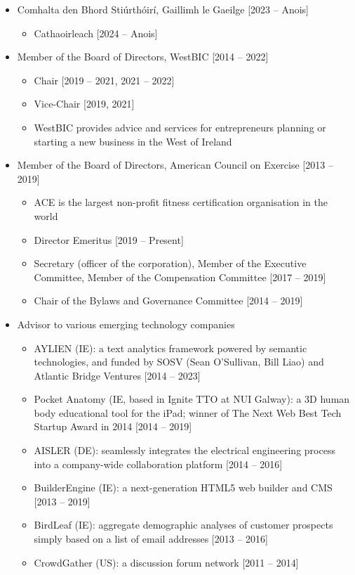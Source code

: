 \documentclass[10pt,a4paper]{res} %
\begin{document}
\begin{resume}
\begin{itemize} \itemsep -2pt
\item Comhalta den Bhord Sti\'{u}rth\'{o}ir\'{i}, Gaillimh le Gaeilge [2023 -- Anois]
\begin{itemize} \itemsep -2pt
\item Cathaoirleach [2024 -- Anois]
\end{itemize}
\item Member of the Board of Directors, WestBIC [2014 -- 2022]
\begin{itemize} \itemsep -2pt
\item Chair [2019 -- 2021, 2021 -- 2022]
\item Vice-Chair [2019, 2021]
\item WestBIC provides advice and services for entrepreneurs planning or starting a new business in the West of Ireland
\end{itemize}
\item Member of the Board of Directors, American Council on Exercise [2013 -- 2019]
\begin{itemize} \itemsep -2pt
\item ACE is the largest non-profit fitness certification organisation in the world
\item Director Emeritus [2019 -- Present]
\item Secretary (officer of the corporation), Member of the Executive Committee, Member of the Compensation Committee [2017 -- 2019]
\item Chair of the Bylaws and Governance Committee [2014 -- 2019]
\end{itemize}
\item Advisor to various emerging technology companies
\begin{itemize} \itemsep -2pt
\item AYLIEN (IE): a text analytics framework powered by semantic technologies, and funded by SOSV (Sean O'Sullivan, Bill Liao) and Atlantic Bridge Ventures [2014 -- 2023]
\item Pocket Anatomy (IE, based in Ignite TTO at NUI Galway): a 3D human body educational tool for the iPad; winner of The Next Web Best Tech Startup Award in 2014 [2014 -- 2019]
\item AISLER (DE): seamlessly integrates the electrical engineering process into a company-wide collaboration platform [2014 -- 2016]
\item BuilderEngine (IE): a next-generation HTML5 web builder and CMS [2013 -- 2019]
\item BirdLeaf (IE): aggregate demographic analyses of customer prospects simply based on a list of email addresses [2013 -- 2016]
\item CrowdGather (US): a discussion forum network [2011 -- 2014]
\end{itemize}
\end{itemize}


\end{resume}
\end{document}
